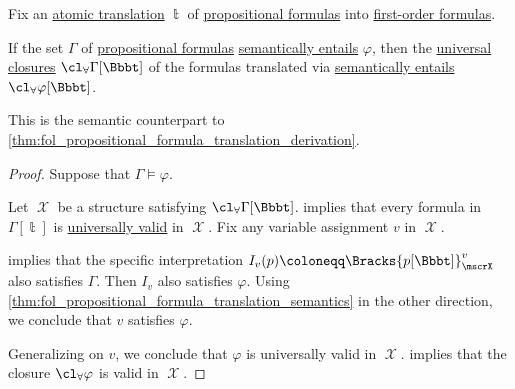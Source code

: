 \begin{corollary}\label{thm:fol_propositional_formula_translation_entailment}
  Fix an \hyperref[def:atomic_fol_propositional_formula_translation]{atomic translation} \( \Bbbt \) of \hyperref[def:propositional_formula]{propositional formulas} into \hyperref[def:fol_formula]{first-order formulas}.

  If the set \( \Gamma \) of \hyperref[def:propositional_formula]{propositional formulas} \hyperref[def:propositional_semantics/entailment]{semantically entails} \( \varphi \), then the \hyperref[def:fol_quantifier_closure]{universal closures} \( \cl_\forall \Gamma[\Bbbt] \) of the formulas translated via  \hyperref[def:fol_semantics/entailment]{semantically entails} \( \cl_\forall \varphi[\Bbbt] \).
\end{corollary}
\begin{comments}
  \item This is the semantic counterpart to \cref{thm:fol_propositional_formula_translation_derivation}.
\end{comments}
\begin{proof}
  Suppose that \( \Gamma \vDash \varphi \).

  Let \( \mscrX \) be a structure satisfying \( \cl_\forall \Gamma[\Bbbt] \).  implies that every formula in \( \Gamma[\Bbbt] \) is \hyperref[def:fol_universal_validity]{universally valid} in \( \mscrX \). Fix any variable assignment \( v \) in \( \mscrX \).

   implies that the specific interpretation \( I_v(p) \coloneqq \Bracks{p[\Bbbt]}_\mscrX^v \) also satisfies \( \Gamma \). Then \( I_v \) also satisfies \( \varphi \). Using \cref{thm:fol_propositional_formula_translation_semantics} in the other direction, we conclude that \( v \) satisfies \( \varphi \).

  Generalizing on \( v \), we conclude that \( \varphi \) is universally valid in \( \mscrX \).  implies that the closure \( \cl_\forall \varphi \) is valid in \( \mscrX \).
\end{proof}

